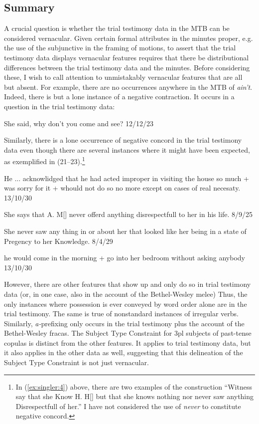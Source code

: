 \documentclass[output=paper,colorlinks,citecolor=brown]{langscibook}
\begin{document}
\subsection{Summary}

A crucial question is whether the trial testimony data in the MTB can be considered vernacular. Given certain formal attributes in the minutes proper, e.g. the use of the subjunctive in the framing of motions, to assert that the trial testimony data displays vernacular features requires that there be distributional differences between the trial testimony data and the minutes.  Before considering these, I wish to call attention to unmistakably vernacular features that are all but absent. For example, there are no occurrences anywhere in the MTB of \textit{ain’t}. Indeed, there is but a lone instance of a negative contraction. It occurs in a question in the trial testimony data:

\ea%
    \label{ex:singler:19}
  She said, why don’t you come and see? 12/12/23    
    \z

Similarly, there is a lone occurrence of negative concord  in the trial testimony data even though there are several instances where it might have been expected, as exemplified in (21--23).\footnote{{In (\ref{ex:singler:4}) above, there are two examples of the construction “Witness say that she Know H. H[] but that she knows nothing nor never saw anything Disrespectfull of her.” I have not considered the use of} {\textit{never}} {to constitute negative concord.}}

\ea%
\label{ex:singler:20}
He ... acknowlidged that he had acted improper in visiting the house so much + was sorry for it + whould not do so no more except on cases of real necesaty. 13/10/30   
\z

         

\ea%
    \label{ex:singler:21}
  She says that A. M[] never offerd anything disrespectfull to her in his life. 8/9/25   
    \z

          

\ea%
    \label{ex:singler:22}
  She never saw any thing in or about her that looked like her being in a state of Pregency to her Knowledge. 8/4/29   
    \z

          

\ea%
    \label{ex:singler:23}
   he would come in the morning + go into her bedroom without asking anybody 13/10/30  
    \z

However, there are other features that show up and only do so in trial testimony data (or, in one case, also in the account of the Bethel-Wesley melee) Thus, the only instances where possession is ever conveyed by word order alone are in the trial testimony. The same is true of nonstandard instances of irregular verbs. Similarly, \textit{a-}prefixing only occurs in the trial testimony plus the account of the Bethel-Wesley fracas. The Subject Type Constraint for 3pl subjects of past-tense copulas is distinct from the other features. It applies to trial testimony data, but it also applies in the other data as well, suggesting that this delineation of the Subject Type Constraint is not just vernacular.
\end{document}
